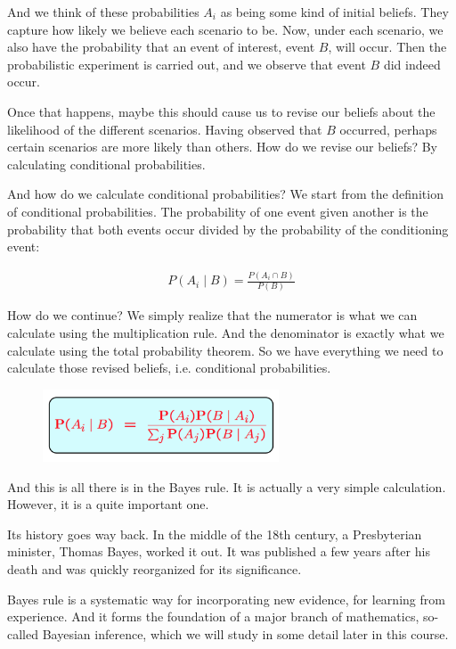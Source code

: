 \documentclass{tufte-handout}
\begin{document}
And we think of these probabilities $A_i$ as being some kind of initial beliefs. They capture how likely we
believe each scenario to be. Now, under each scenario, we also have the probability that an event of
interest, event $B$, will occur. Then the probabilistic experiment is carried out, and we observe
that event $B$ did indeed occur.

Once that happens, maybe this should cause us to revise our beliefs about the likelihood of the different
scenarios. Having observed that $B$ occurred, perhaps certain scenarios are more likely than others.
How do we revise our beliefs? By calculating conditional probabilities.

And how do we calculate conditional probabilities? We start from the definition of conditional
probabilities. The probability of one event given another is the probability that both events occur divided
by the probability of the conditioning event:

\begin{align*}
P(A_i \mid B) = \frac{P(A_i \cap B)}{P(B)}
\end{align*}


How do we continue? We simply realize that the numerator is what we can calculate using the
multiplication rule. And the denominator is exactly what we calculate using the total probability theorem.
So we have everything we need to calculate those revised beliefs, i.e. conditional probabilities.

\begin{figure}
  \includegraphics[width=7cm]{BayesRule}
\end{figure}


And this is all there is in the Bayes rule. It is actually a very simple calculation. However, it is a quite important one.

Its history goes way back. In the middle of the 18th century, a Presbyterian minister, Thomas Bayes,
worked it out. It was published a few years after his death and was quickly reorganized for its
significance. 

Bayes rule is a systematic way for incorporating new evidence, for learning from experience. And it forms the 
foundation of a major branch of mathematics, so-called Bayesian inference, which we will study in some detail 
later in this course. 
\end{document}
